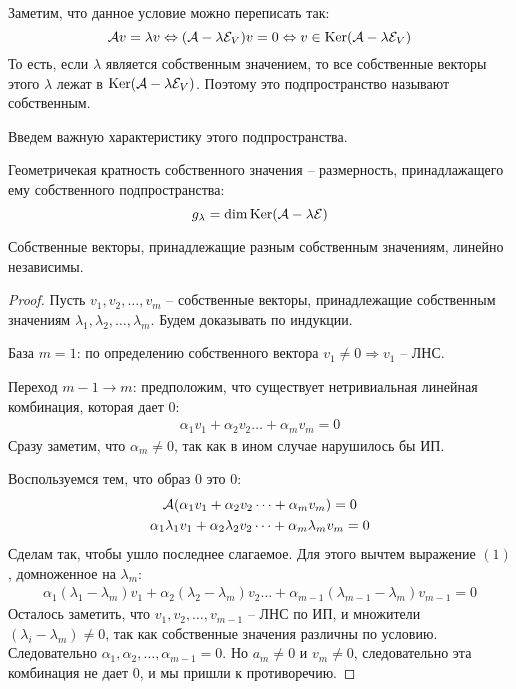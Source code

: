 Заметим, что данное условие можно переписать так:
\[ \mathcal{A} v = \lambda v \Leftrightarrow (\mathcal{A} - \lambda\mathcal{E}_V)v = 0 \Leftrightarrow v \in \operatorname{Ker}(\mathcal{A} - \lambda\mathcal{E}_V) \]
То есть, если $\lambda$ является собственным значением, то все собственные векторы этого $\lambda$ лежат в $\operatorname{Ker}(\mathcal{A} - \lambda\mathcal{E}_V)$. 
Поэтому это подпространство называют собственным.

Введем важную характеристику этого подпространства.

\begin{conj}
    Геометричекая кратность собственного значения -- размерность, принадлажащего ему собственного подпространства:
    \[ g_\lambda = \dim \operatorname{Ker}(\mathcal{A} - \lambda\mathcal{E}) \]
\end{conj}

\begin{theorem}
    Собственные векторы, принадлежащие разным собственным значениям, линейно независимы.
\end{theorem}

\begin{proof}
    Пусть $v_1, v_2, \dots, v_m$ -- собственные векторы, принадлежащие собственным значениям $\lambda_1, \lambda_2, \dots, \lambda_m$.
    Будем доказывать по индукции.
    
    База $m = 1$: по определению собственного вектора $v_1 \neq 0 \Rightarrow v_1$ -- ЛНС.

    Переход $m - 1 \to m$: предположим, что существует нетривиальная линейная комбинация, которая дает 0:
    \begin{gather}
        \alpha_1v_1 + \alpha_2v_2 \dots + \alpha_mv_m = 0
    \end{gather}
    \quad Сразу заметим, что $\alpha_m \neq 0$, так как в ином случае нарушилось бы ИП. 

    \quad Воспользуемся тем, что образ 0 это 0:
    \begin{gather*}
        \mathcal{A}(\alpha_1v_1 + \alpha_2v_2 \dots + \alpha_mv_m) = 0 \\
        \alpha_1\lambda_1v_1 + \alpha_2\lambda_2v_2 \dots + \alpha_m\lambda_mv_m = 0
    \end{gather*}
    \quad Сделам так, чтобы ушло последнее слагаемое.
    Для этого вычтем выражение $(1)$, домноженное на $\lambda_m$:
    \begin{gather*}
        \alpha_1(\lambda_1 - \lambda_m)v_1 + \alpha_2(\lambda_2 - \lambda_m)v_2 \dots + \alpha_{m - 1}(\lambda_{m - 1} - \lambda_m)v_{m - 1} = 0
    \end{gather*}
    \quad Осталось заметить, что $v_1, v_2, \dots, v_{m - 1}$ -- ЛНС по ИП, и множители $(\lambda_i - \lambda_m) \neq 0$, так как собственные значения различны по условию.
    Следовательно $\alpha_1, \alpha_2, \dots, \alpha_{m-1} = 0$. 
    Но $a_m \neq 0$ и $v_m \neq 0$, следовательно эта комбинация не дает 0, и мы пришли к противоречию.
\end{proof}

